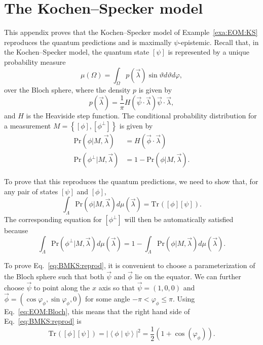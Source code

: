 \documentclass[DIV=calc,fontsize=12pt]{scrartcl} %
\theoremstyle{definition}
\theoremstyle{plain}
\newcommand{\BraKet}[2]{\ensuremath{\left \langle #1 \middle \vert #2
\right \rangle}}
\newcommand{\Proj}[1]{\ensuremath{\left [ #1 \right ]}}
\newcommand{\Tr}[2][]{\ensuremath{\text{Tr}_{#1} \left ( #2 \right )}}
\begin{document}
\section{The Kochen--Specker model}

\label{App:BMKS}

This appendix proves that the Kochen--Specker model of
Example~\ref{exa:EOM:KS} reproduces the quantum predictions and is
maximally $\psi$-epistemic.  Recall that, in the Kochen--Specker model,
the quantum state $\Proj{\psi}$ is represented by a unique probability
measure
\begin{equation}
\mu(\Omega) = \int_{\Omega} p(\vec{\lambda}) \sin \vartheta
d\vartheta d\varphi,
\end{equation}
over the Bloch sphere, where the density $p$ is given by
\begin{equation}
p(\vec{\lambda}) = \frac{1}{\pi} H \left ( \vec{\psi} \cdot
\vec{\lambda} \right ) \vec{\psi} \cdot \vec{\lambda},
\end{equation}
and $H$ is the Heaviside step function.  The conditional probability
distribution for a measurement $M = \left \{ \Proj{\phi},
\Proj{\phi^{\perp}} \right \}$ is given by
\begin{align}
\text{Pr}(\phi|M, \vec{\lambda}) & = H (\vec{\phi} \cdot
\vec{\lambda}) \\
\text{Pr}(\phi^{\perp}|M, \vec{\lambda}) & = 1 - \text{Pr}(\phi |M,
\vec{\lambda}).
\end{align}

To prove that this reproduces the quantum predictions, we need to show
that, for any pair of states $\Proj{\psi}$ and $\Proj{\phi}$,
\begin{equation}
\label{eq:BMKS:reprod}
\int_{\Lambda} \text{Pr}(\phi|M,\vec{\lambda}) d\mu(\vec{\lambda}) =
\Tr{\Proj{\phi}\Proj{\psi}}.
\end{equation}
The corresponding equation for $\Proj{\phi^{\perp}}$ will then be
automatically satisfied because
\begin{equation}
\int_{\Lambda} \text{Pr}(\phi^{\perp}|M,\vec{\lambda})
d\mu(\vec{\lambda}) = 1 -  \int_{\Lambda}
\text{Pr}(\phi|M,\vec{\lambda}) d\mu(\vec{\lambda}).
\end{equation}

To prove Eq.~\eqref{eq:BMKS:reprod}, it is convenient to choose a
parameterization of the Bloch sphere such that both $\vec{\psi}$ and
$\vec{\phi}$ lie on the equator.  We can further choose $\vec{\psi}$
to point along the $x$ axis so that $\vec{\psi} = (1,0,0)$ and
$\vec{\phi} = (\cos \varphi_{\phi}, \sin \varphi_{\phi}, 0)$ for some
angle $-\pi < \varphi_{\phi} \leq \pi$.  Using
Eq.~\eqref{eq:EOM:Bloch}, this means that the right hand side of
Eq.~\eqref{eq:BMKS:reprod} is
\begin{equation}
\Tr{\Proj{\phi}\Proj{\psi}} = \left | \BraKet{\phi}{\psi} \right
|^2 = \frac{1}{2}\left ( 1 + \cos(\varphi_{\phi}) \right ).
\end{equation}
\end{document}
